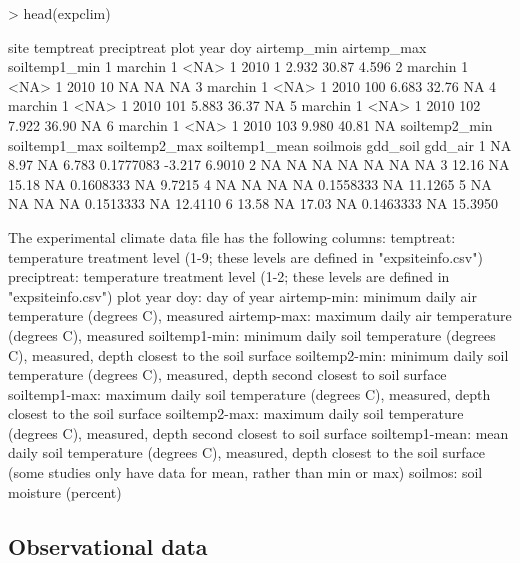 \documentclass{article}
\begin{document}
\begin{Schunk}
\begin{Sinput}
> head(expclim)
\end{Sinput}
\begin{Soutput}
     site temptreat preciptreat plot year doy airtemp_min airtemp_max soiltemp1_min
1 marchin         1        <NA>    1 2010   1       2.932       30.87         4.596
2 marchin         1        <NA>    1 2010  10          NA          NA            NA
3 marchin         1        <NA>    1 2010 100       6.683       32.76            NA
4 marchin         1        <NA>    1 2010 101       5.883       36.37            NA
5 marchin         1        <NA>    1 2010 102       7.922       36.90            NA
6 marchin         1        <NA>    1 2010 103       9.980       40.81            NA
  soiltemp2_min soiltemp1_max soiltemp2_max soiltemp1_mean  soilmois gdd_soil gdd_air
1            NA          8.97            NA          6.783 0.1777083   -3.217  6.9010
2            NA            NA            NA             NA        NA       NA      NA
3         12.16            NA         15.18             NA 0.1608333       NA  9.7215
4            NA            NA            NA             NA 0.1558333       NA 11.1265
5            NA            NA            NA             NA 0.1513333       NA 12.4110
6         13.58            NA         17.03             NA 0.1463333       NA 15.3950
\end{Soutput}
\end{Schunk}
The experimental climate data file has the following columns:
temptreat: temperature treatment level (1-9; these levels are defined in "expsiteinfo.csv")
preciptreat: temperature treatment level (1-2; these levels are defined in "expsiteinfo.csv")
plot
year
doy: day of year
airtemp-min: minimum daily air temperature (degrees C), measured
airtemp-max: maximum daily air temperature (degrees C), measured
soiltemp1-min: minimum daily soil temperature (degrees C), measured, depth closest to the soil surface
soiltemp2-min: minimum daily soil temperature (degrees C), measured, depth second closest to soil surface
soiltemp1-max: maximum daily soil temperature (degrees C), measured, depth closest to the soil surface
soiltemp2-max: maximum daily soil temperature (degrees C), measured, depth second closest to soil surface
soiltemp1-mean: mean daily soil temperature (degrees C), measured, depth closest to the soil surface (some studies only have data for mean, rather than min or max)
soilmos: soil moisture (percent)

\subsection{Observational data}
\end{document}
